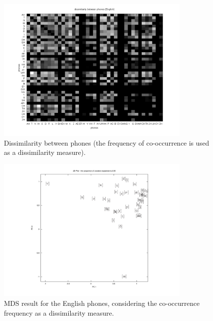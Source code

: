 \begin{figure}[h!]
\centering
\includegraphics[width=0.85\textwidth]{images/phonesLogDissimilarityFreqFeatures.png}
\caption{Dissimilarity between phones (the frequency of co-occurrence is used as a dissimilarity measure).}
\label{fig:phonesLogDissimilarityFreqFeatures}
\end{figure}

\begin{figure}[h!]
\centering
\includegraphics[width=0.85\textwidth]{images/phonesDistFeaturesFreqMDS.pdf}
\caption{MDS result for the English phones, considering the co-occurrence frequency as a dissimilarity measure.}
\label{fig:phonesDistFeaturesFreqMDS}
\end{figure}


